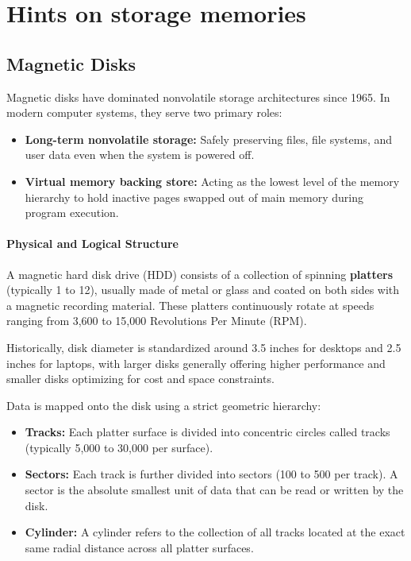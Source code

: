 \section{Hints on storage memories}
\subsection{Magnetic Disks}
Magnetic disks have dominated nonvolatile storage architectures since 1965. In modern computer systems, they serve two primary roles:
\begin{itemize}
    \item \textbf{Long-term nonvolatile storage:} Safely preserving files, file systems, and user data even when the system is powered off.
    \item \textbf{Virtual memory backing store:} Acting as the lowest level of the memory hierarchy to hold inactive pages swapped out of main memory during program execution.
\end{itemize}

\paragraph{Physical and Logical Structure}
A magnetic hard disk drive (HDD) consists of a collection of spinning \textbf{platters} (typically 1 to 12), usually made of metal or glass and coated on both sides with a magnetic recording material. These platters continuously rotate at speeds ranging from 3,600 to 15,000 Revolutions Per Minute (RPM). 

Historically, disk diameter is standardized around 3.5 inches for desktops and 2.5 inches for laptops, with larger disks generally offering higher performance and smaller disks optimizing for cost and space constraints. 

Data is mapped onto the disk using a strict geometric hierarchy:
\begin{itemize}
    \item \textbf{Tracks:} Each platter surface is divided into concentric circles called tracks (typically 5,000 to 30,000 per surface).
    \item \textbf{Sectors:} Each track is further divided into sectors (100 to 500 per track). A sector is the absolute smallest unit of data that can be read or written by the disk.
    \item \textbf{Cylinder:} A cylinder refers to the collection of all tracks located at the exact same radial distance across all platter surfaces. 
\end{itemize}

